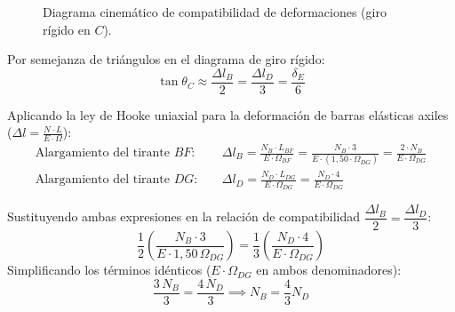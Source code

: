\begin{figure}[H]
{%
    }
    \caption{Diagrama cinemático de compatibilidad de deformaciones (giro rígido en $C$).}
    \label{fig:examen_tirantes_cinematica}
\end{figure}

Por semejanza de triángulos en el diagrama de giro rígido:
\begin{equation}
    \tan\theta_C \approx \frac{\Delta l_B}{2} = \frac{\Delta l_D}{3} = \frac{\delta_E}{6}
    \label{eq:semejanza_triangulos}
\end{equation}

Aplicando la ley de Hooke uniaxial para la deformación de barras elásticas axiles ($\Delta l = \frac{N \cdot L}{E \cdot \Omega}$):
\begin{align}
    \text{Alargamiento del tirante } BF: & \quad \Delta l_B = \frac{N_B \cdot L_{BF}}{E \cdot \Omega_{BF}} = \frac{N_B \cdot 3}{E \cdot (1{,}50 \cdot \Omega_{DG})} = \frac{2 \cdot N_B}{E \cdot \Omega_{DG}} \\[6pt]
    \text{Alargamiento del tirante } DG: & \quad \Delta l_D = \frac{N_D \cdot L_{DG}}{E \cdot \Omega_{DG}} = \frac{N_D \cdot 4}{E \cdot \Omega_{DG}}
\end{align}

Sustituyendo ambas expresiones en la relación de compatibilidad $\dfrac{\Delta l_B}{2} = \dfrac{\Delta l_D}{3}$:
\begin{equation}
    \frac{1}{2} \left( \frac{N_B \cdot 3}{E \cdot 1{,}50\,\Omega_{DG}} \right) = \frac{1}{3} \left( \frac{N_D \cdot 4}{E \cdot \Omega_{DG}} \right)
\end{equation}
Simplificando los términos idénticos ($E \cdot \Omega_{DG}$ en ambos denominadores):
\begin{equation}
    \frac{3\,N_B}{3} = \frac{4\,N_D}{3} \implies \boxed{N_B = \frac{4}{3}N_D}
    \label{eq:relacion_esfuerzos}
\end{equation}


